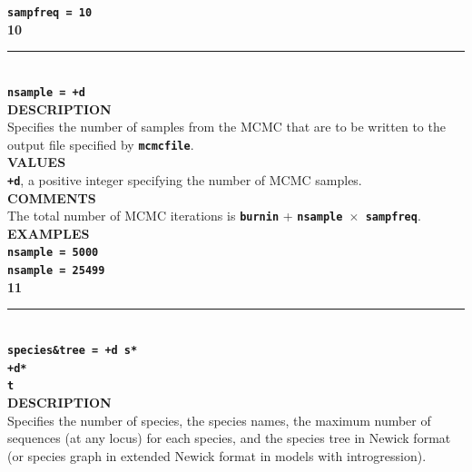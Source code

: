 \documentclass{book}
\numberwithin{equation}{section} \renewcommand{\baselinestretch}{0.55}
\begin{document}
\textbf{\texttt{sampfreq = 10}}\vspace{10pt}\\
\textbf{{\large 10}} \\
\noindent\rule{\textwidth}{0.8pt} \\
\textbf{{\Large \texttt{nsample = +d}}} \vspace{5pt}\\
\textbf{DESCRIPTION} \vspace{5pt}\\
Specifies the number of samples from the MCMC that are to be written to the output file specified by \textbf{\texttt{mcmcfile}}. \vspace{5pt}\\
\textbf{VALUES} \vspace{5pt}\\
\textbf{\texttt{+d}}, a positive integer specifying the number of MCMC samples. \vspace{5pt}\\
\textbf{COMMENTS} \vspace{5pt}\\
The total number of MCMC iterations is \textbf{\texttt{burnin}} + \textbf{\texttt{nsample $\times$ sampfreq}}. \vspace{5pt}\\
\textbf{EXAMPLES} \vspace{5pt}\\
\textbf{\texttt{nsample = 5000}} \vspace{5pt}\\
\textbf{\texttt{nsample = 25499}}\vspace{10pt}\\
\textbf{{\large 11}} \\
\noindent\rule{\textwidth}{0.8pt} \\
\textbf{{\Large \texttt{species\&tree = +d s*}}} \vspace{2pt}\\
\hspace*{9.2pc} \textbf{{\Large \texttt{+d*}}} \vspace{2pt}\\
\hspace*{9.2pc} \textbf{{\Large \texttt{t}}} \vspace{5pt}\\
\textbf{DESCRIPTION} \vspace{5pt}\\
Specifies the number of species, the species names, the maximum number of sequences (at any locus) for each species, and the species tree in Newick format (or species graph in extended Newick format in models with introgression).\vspace{5pt}\\
\end{document}
